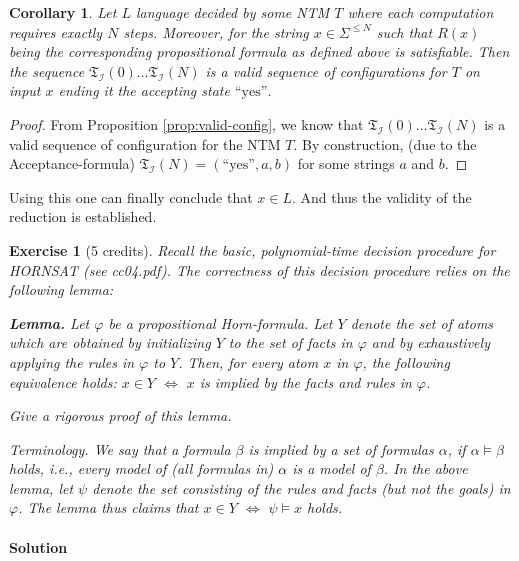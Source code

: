 \documentclass [11pt]{article}
\newtheorem{corollary}[theorem]{Corollary}
\newtheorem{exercise}[theorem]{Exercise}
\newcommand{\LR}{\Leftrightarrow}
\renewcommand{\phi}{\varphi}
\newcommand{\yess}{\mbox{``yes''}}
\newcommand{\trans}[1]{\mathfrak{T}_{\mathcal{#1}}}
\begin{document}
\begin{corollary}
\label{prop:fin-config}
Let $L$ language decided by some NTM $T$ where each computation requires exactly $N$ steps. Moreover, for the string $x \in \Sigma^{\leq N}$ such that $R(x)$  being the corresponding propositional formula as defined above is satisfiable.
Then the sequence $\trans{I}(0)\dots \trans{I}(N)$ is a valid sequence of configurations for $T$ on input $x$ ending it the accepting state $\yess$. 
\end{corollary}
\begin{proof}
From Proposition \ref{prop:valid-config}, we know that $\trans{I}(0)\dots \trans{I}(N)$ is a valid sequence of configuration for the NTM $T$. By construction, (due to the Acceptance-formula) $\trans{I}(N)=(\yess, a,b)$ for some strings $a$ and $b$. 
\end{proof}

Using this one can finally conclude that $x \in L$. And thus the validity of the reduction is established.
\newpage

\noindent
\begin{exercise}[5 credits]
{\em 
Recall the basic, polynomial-time decision procedure for HORNSAT (see cc04.pdf).
The correctness of this decision procedure 
relies on the following lemma:
}%

\medskip

\noindent
{\bf Lemma.}
Let $\phi$ be a propositional Horn-formula. Let 
$Y$ denote the set of atoms which are obtained by 
initializing $Y$ to the set of facts in $\phi$ and by 
exhaustively applying the rules in $\phi$ to $Y$.
Then, for every atom $x$ in $\phi$, the following equivalence holds: 
%
$x \in Y$ $\LR$ 
$x$ is implied by the facts and rules in $\phi$.

\medskip
\noindent
{\em 
Give a rigorous proof of this lemma.
}%

\medskip
\noindent
{\em 
Terminology. We say that a formula $\beta$ is implied by a set of formulas $\alpha$, if
$\alpha \models \beta$ holds, i.e., every model of (all formulas in) $\alpha$ is a 
model of $\beta$. In the above lemma, let $\psi$ denote the set consisting of the 
rules and facts (but not the goals) in $\phi$. The lemma thus claims that   
$x \in Y$ $\LR$ $\psi \models x$ holds.
}%

\end{exercise}


\paragraph*{Solution}
\end{document}
